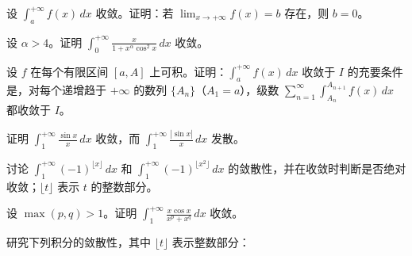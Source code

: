 \noindent\begin{minipage}{\textwidth}
设 $\int_a^{+\infty}f(x)\,dx$ 收敛。证明：若 $\lim_{x\to+\infty}f(x)=b$ 存在，则 $b=0$。
\end{minipage}\par\vfill
\noindent\begin{minipage}{\textwidth}
设 $\alpha>4$。证明 $\displaystyle\int_0^{+\infty}\frac{x}{1+x^\alpha\cos^2x}\,dx$ 收敛。
\end{minipage}\par\vfill
\newpage
\noindent\begin{minipage}{\textwidth}
设 $f$ 在每个有限区间 $[a,A]$ 上可积。证明：$\int_a^{+\infty}f(x)\,dx$ 收敛于 $I$ 的充要条件是，对每个递增趋于 $+\infty$ 的数列 $\{A_n\}$（$A_1=a$），级数 $\displaystyle\sum_{n=1}^{\infty}\int_{A_n}^{A_{n+1}}f(x)\,dx$ 都收敛于 $I$。
\end{minipage}\par\vfill
\noindent\begin{minipage}{\textwidth}
证明 $\displaystyle\int_1^{+\infty}\frac{\sin x}{x}\,dx$ 收敛，而 $\displaystyle\int_1^{+\infty}\frac{|\sin x|}{x}\,dx$ 发散。
\end{minipage}\par\vfill
\noindent\begin{minipage}{\textwidth}
讨论 $\displaystyle\int_1^{+\infty}(-1)^{\lfloor x\rfloor}\,dx$ 和 $\displaystyle\int_1^{+\infty}(-1)^{\lfloor x^2\rfloor}\,dx$ 的敛散性，并在收敛时判断是否绝对收敛；$\lfloor t\rfloor$ 表示 $t$ 的整数部分。
\end{minipage}\par\vfill
\newpage
\noindent\begin{minipage}{\textwidth}
设 $\max(p,q)>1$。证明 $\displaystyle\int_1^{+\infty}\frac{x\cos x}{x^p+x^q}\,dx$ 收敛。
\end{minipage}\par\vfill
\noindent\begin{minipage}{\textwidth}
研究下列积分的敛散性，其中 $\lfloor t\rfloor$ 表示整数部分：
\end{minipage}\par\vfill
